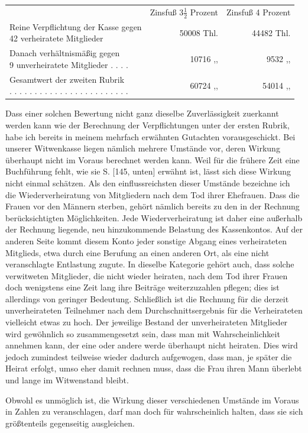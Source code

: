 \begin{center}
\footnotesize\setlength{\tabcolsep}{3pt}
\begin{tabular}{l r|r}
&Zinsfuß \(3\tfrac{1}{2}\) Prozent&Zinsfuß 4 Prozent\\
\shortstack[l]{Reine Verpflichtung der Kasse gegen\\42 verheiratete Mitglieder}&50008 Thl.&44482 Thl.\\
\shortstack[l]{Danach verhältnismäßig gegen\\9 unverheiratete Mitglieder . . . .}&10716 ,, &9532 ,, \\[5pt]
\shortstack[l]{Gesamtwert der zweiten Rubrik\\ . . . . . . . . . . . . . . . . . . . . . . . .}&60724 ,, &54014 ,,
\end{tabular}
\end{center}
\noindent\hspace*{\parindent}Dass einer solchen Bewertung nicht ganz dieselbe Zuverlässigkeit zuerkannt werden kann wie der Berechnung der Verpflichtungen unter der ersten Rubrik, habe ich bereits in meinem mehrfach erwähnten Gutachten vorausgeschickt. Bei unserer Witwenkasse liegen nämlich mehrere Umstände vor, deren Wirkung überhaupt nicht im Voraus berechnet werden kann. Weil für die frühere Zeit eine Buchführung fehlt, wie sie S. [145, unten] erwähnt ist, lässt sich diese Wirkung nicht einmal schätzen. Als den einflussreichsten dieser Umstände bezeichne ich die Wiederverheiratung von Mitgliedern nach dem Tod ihrer Ehefrauen. Dass die Frauen vor den Männern sterben, gehört nämlich bereits zu den in der Rechnung berücksichtigten Möglichkeiten. Jede Wiederverheiratung ist daher eine außerhalb der Rechnung liegende, neu hinzukommende Belastung des Kassenkontos. Auf der anderen Seite kommt diesem Konto jeder sonstige Abgang eines verheirateten Mitglieds, etwa durch eine Berufung an einen anderen Ort, als eine nicht veranschlagte Entlastung zugute. In dieselbe Kategorie gehört auch, dass solche verwitweten Mitglieder, die nicht wieder heiraten, nach dem Tod ihrer Frauen doch wenigstens eine Zeit lang ihre Beiträge weiterzuzahlen pflegen; dies ist allerdings von geringer Bedeutung. Schließlich ist die Rechnung für die derzeit unverheirateten Teilnehmer nach dem Durchschnittsergebnis für die Verheirateten vielleicht etwas zu hoch. Der jeweilige Bestand der unverheirateten Mitglieder wird gewöhnlich so zusammengesetzt sein, dass man mit Wahrscheinlichkeit annehmen kann, der eine oder andere werde überhaupt nicht heiraten. Dies wird jedoch zumindest teilweise wieder dadurch aufgewogen, dass man, je später die Heirat erfolgt, umso eher damit rechnen muss, dass die Frau ihren Mann überlebt und lange im Witwenstand bleibt.

Obwohl es unmöglich ist, die Wirkung dieser verschiedenen Umstände im Voraus in Zahlen zu veranschlagen, darf man doch für wahrscheinlich halten, dass sie sich größtenteils gegenseitig ausgleichen.


